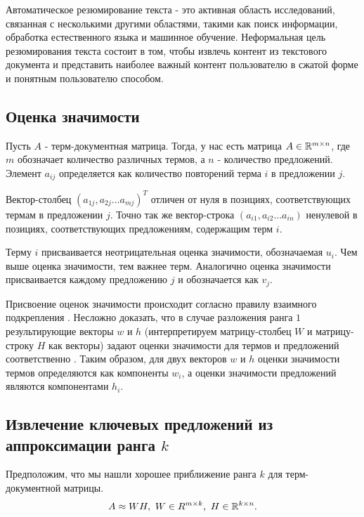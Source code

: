 Автоматическое резюмирование текста - это активная область исследований, связанная с несколькими другими областями,
такими как поиск информации, обработка естественного языка и машинное обучение.
Неформальная цель резюмирования текста состоит в том, чтобы извлечь контент из текстового документа
и представить наиболее важный контент пользователю в сжатой форме и понятным пользователю способом.



\subsection{Оценка значимости}

Пусть $A$ - терм-документная матрица. Тогда, у нас есть матрица $A \in \mathbb{R}^{m \times n}$,
где $m$ обозначает количество различных термов, а $n$ - количество предложений.
Элемент $a_{ij}$ определяется как количество повторений терма $i$ в предложении $j$.

Вектор-столбец $(a_{1j}, a_{2j} \ldots a_{mj})^T$ отличен от нуля в позициях, соответствующих термам в предложении $j$.
Точно так же вектор-строка $(a_{i1}, a_{i2} \ldots a_{in})$ ненулевой в позициях, соответствующих предложениям, содержащим терм $i$.

Терму $i$ присваивается неотрицательная оценка значимости, обозначаемая $u_i$.
Чем выше оценка значимости, тем важнее терм. Аналогично оценка значимости присваивается каждому предложению $j$ и обозначается как $v_j$.

Присвоение оценок значимости происходит согласно правилу взаимного подкрепления \cite{zha}.
Несложно доказать, что в случае разложения ранга $1$ результирующие векторы $w$ и $h$
(интерпретируем матрицу-столбец $W$ и матрицу-строку $H$ как векторы) задают оценки значимости для термов и предложений соответственно \cite{elden}.
Таким образом, для двух векторов $w$ и $h$ оценки значимости термов определяются как компоненты $w_i$,
а оценки значимости предложений являются компонентами $h_i$.



\newpage



\subsection{Извлечение ключевых предложений из аппроксимации ранга $k$}

Предположим, что мы нашли хорошее приближение ранга $k$ для терм-\\документной матрицы.
\begin{equation*}
  A \approx W H, \ W \in R^{m \times k}, \ H \in \mathbb{R}^{k \times n}.
\end{equation*}


